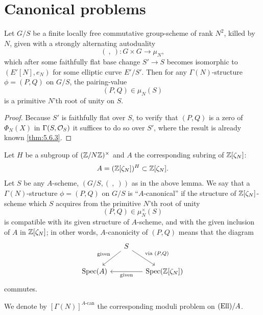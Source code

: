 \section{Canonical problems}
\label{sec:10.4}

\begin{klem}\label{lem:10.4.1}
Let $G/S$ be a finite locally free commutative group-scheme of rank $N^2$, killed by $N$, given with a strongly alternating autoduality
\[
(\ ,\ ) : G \times G \to \mu_N ,
\]
which after some faithfully flat base change $S' \to S$ becomes isomorphic to $(E'[N], e_N)$ for some elliptic curve $E'/S'$. Then for any $\Gamma(N)$-structure $\phi = (P,Q)$ on $G/S$, the pairing-value
\[
(P,Q) \in \mu_N(S)
\]
is a primitive $N$'th root of unity on $S$.
\end{klem}

\begin{proof}
Because $S'$ is faithfully flat over $S$, to verify that $(P,Q)$ is a zero of $\Phi_N(X)$ in $\Gamma(S, \mathcal{O}_S)$ it suffices to do so over $S'$, where the result is already known \eqref{thm:5.6.3}.
\end{proof}

\kmitem\label{item:10.4.2}
Let $H$ be a subgroup of $(\mathbb{Z}/N\mathbb{Z})^\times$ and $A$ the corresponding subring of $\mathbb{Z}[\zeta_N]$:
\[
A = (\mathbb{Z}[\zeta_N])^H \subset \mathbb{Z}[\zeta_N] .
\]
Let $S$ be any $A$-scheme, $(G/S, (\ ,\ ))$ as in the above lemma. We say that a $\Gamma(N)$-structure $\phi = (P,Q)$ on $G/S$ is ``$A$-canonical'' if the structure of $\mathbb{Z}[\zeta_N]$-scheme which $S$ acquires from the primitive $N$'th root of unity
\[
(P,Q) \in \mu_N^\times(S)
\]
is compatible with its given structure of $A$-scheme, and with the given inclusion of $A$ in $\mathbb{Z}[\zeta_N]$; in other words, $A$-canonicity of $(P,Q)$ means that the diagram
\begin{equation*}
\begin{tikzcd}[row sep=2em, column sep=1.5em]
& S \arrow[ld, "\text{given}"'] \arrow[rd, "{\text{via } (P,Q)}"] & \\
\Spec(A) & & \Spec(\Z[\zeta_N]) \arrow[ll, "\text{given}"]
\end{tikzcd}
\end{equation*}
commutes.

We denote by $[\Gamma(N)]^{A\text{-can}}$ the corresponding moduli problem on $(\mathrm{Ell})/A$.

